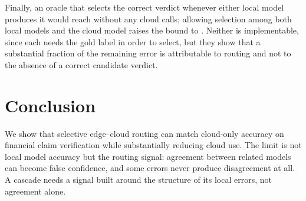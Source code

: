 \documentclass{article}
\begin{document}
Finally, an oracle that selects the correct verdict whenever either local model produces it would reach \oracleLocalOnly{} without any cloud calls; allowing selection among both local models and the cloud model raises the bound to \oracleThreeWay{}. Neither is implementable, since each needs the gold label in order to select, but they show that a substantial fraction of the remaining error is attributable to routing and not to the absence of a correct candidate verdict.



\section{Conclusion}
\label{sec:conclusion}


We show that selective edge--cloud routing can match cloud-only accuracy on financial claim verification while substantially reducing cloud use. The limit is not local model accuracy but the routing signal: agreement between related models can become false confidence, and some errors never produce disagreement at all. A cascade needs a signal built around the structure of its local errors, not agreement alone.






% 
\end{document}
